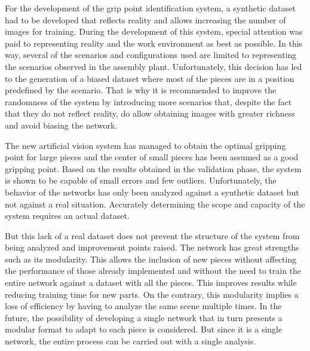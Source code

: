 {For the development of the grip point identification system, a synthetic dataset had to be developed that reflects reality and allows increasing the number of images for training. During the development of this system, special attention was paid to representing reality and the work environment as best as possible. In this way, several of the scenarios and configurations used are limited to representing the scenarios observed in the assembly plant. Unfortunately, this decision has led to the generation of a biased dataset where most of the pieces are in a position predefined by the scenario. That is why it is recommended to improve the randomness of the system by introducing more scenarios that, despite the fact that they do not reflect reality, do allow obtaining images with greater richness and avoid biasing the network.

The new artificial vision system has managed to obtain the optimal gripping point for large pieces and the center of small pieces has been assumed as a good gripping point. Based on the results obtained in the validation phase, the system is shown to be capable of small errors and few outliers. Unfortunately, the behavior of the networks has only been analyzed against a synthetic dataset but not against a real situation. Accurately determining the scope and capacity of the system requires an actual dataset.

But this lack of a real dataset does not prevent the structure of the system from being analyzed and improvement points raised. The network has great strengths such as its modularity. This allows the inclusion of new pieces without affecting the performance of those already implemented and without the need to train the entire network against a dataset with all the pieces. This improves results while reducing training time for new parts. On the contrary, this modularity implies a loss of efficiency by having to analyze the same scene multiple times. In the future, the possibility of developing a single network that in turn presents a modular format to adapt to each piece is considered. But since it is a single network, the entire process can be carried out with a single analysis.
}